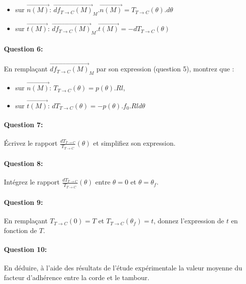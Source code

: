 \begin{itemize}
 \item sur $\overrightarrow{n(M)}$: $\overrightarrow{df_{T \rightarrow C}(M)}_M.\overrightarrow{n(M)}=T_{T \rightarrow C}(\theta).d \theta$ 
 \item sur $\overrightarrow{t(M)}$: $\overrightarrow{df_{T \rightarrow C}(M)}_M.\overrightarrow{t(M)}=-dT_{T \rightarrow C}(\theta)$ 
\end{itemize}

\paragraph{Question 6:} En remplaçant $\overrightarrow{df_{T \rightarrow C}(M)}_M$ par son expression (question 5), montrez que :

\begin{itemize}
 \item sur $\overrightarrow{n(M)}$: $T_{T \rightarrow C}(\theta)=p(\theta).Rl$,
 \item sur $\overrightarrow{t(M)}$: $dT_{T \rightarrow C}(\theta)=-p(\theta).f_0.Rld \theta$ 
\end{itemize}



\paragraph{Question 7:} Écrivez le rapport $\frac{dT_{T \rightarrow C}}{T_{T \rightarrow C}}(\theta)$ et simplifiez son expression.



\paragraph{Question 8:} Intégrez le rapport $\frac{dT_{T \rightarrow C}}{T_{T \rightarrow C}}(\theta)$ entre $\theta=0$ et $\theta=\theta_f$.



\paragraph{Question 9:} En remplaçant $T_{T \rightarrow C}(0)=T$ et $T_{T \rightarrow C}(\theta_f)=t$, donnez l'expression de $t$ en fonction de $T$.



\paragraph{Question 10:} En déduire, à l'aide des résultats de l'étude expérimentale la valeur moyenne du facteur d'adhérence entre la corde et le tambour. 



